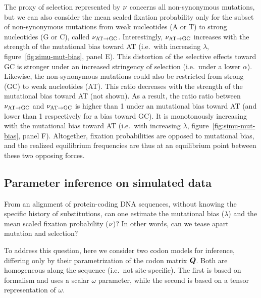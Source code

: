 \documentclass{article}
\begin{document}
The proxy of selection represented by $\nu$ concerns all {non-synonymous} mutations, but we can also consider the mean scaled fixation probability only for the subset of {non-synonymous} mutations from weak nucleotides (A or T) to strong nucleotides (G or C), called $\nu_{\text{AT} \rightarrow \text{GC}}$.
Interestingly, $\nu_{\text{AT} \rightarrow \text{GC}}$ increases with the strength of the mutational bias toward AT (i.e.~with increasing $\lambda$, figure~\ref{fig:simu-mut-bias}, panel E).
This distortion of the selective effects toward GC is stronger under an increased stringency of selection (i.e.~under a lower $\alpha$).
Likewise, the {non-synonymous} mutations could also be restricted from strong (GC) to weak nucleotides (AT).
This ratio decreases with the strength of the mutational bias toward AT (not shown).
As a result, the ratio ratio between $\nu_{\text{AT} \rightarrow \text{GC}}$ and $\nu_{\text{AT} \rightarrow \text{GC}}$ is higher than 1 under an mutational bias toward AT (and lower than 1 respectively for a bias toward GC).
It is monotonously increasing with the mutational bias toward AT (i.e.~with increasing $\lambda$, figure~\ref{fig:simu-mut-bias}, panel F).
Altogether, fixation probabilities are opposed to mutational bias, and the realized equilibrium frequencies are thus at an equilibrium point between these two opposing forces.

\subsection{Parameter inference on simulated data}
\label{subsec:parameter-inference-on-simulated-data}

From an alignment of protein-coding {DNA} sequences, without knowing the specific history of {substitutions}, can one estimate the mutational bias ($\lambda$) and the mean scaled fixation probability ($\nu$)?
In other words, can we tease apart mutation and selection?

To address this question, here we consider two codon models for inference, differing only by their parametrization of the codon matrix $\bm{Q}$.
Both are homogeneous along the sequence (i.e.~not site-specific).
The first is based on \citet{Muse1994} formalism and uses a scalar $\omega$ parameter, while the second is based on a tensor representation of $\omega$.
\end{document}
